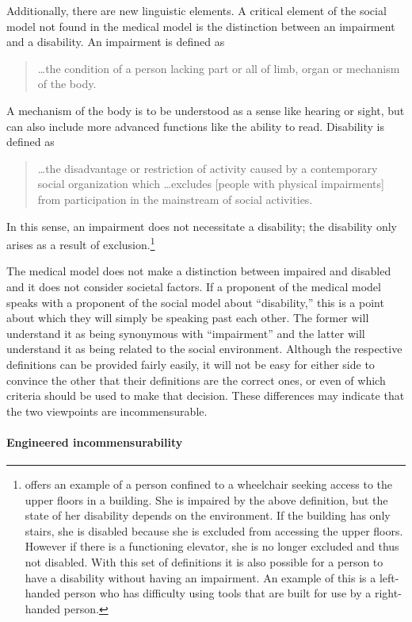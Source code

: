 \documentclass[a4paper]{article}
\begin{document}
Additionally, there are new linguistic elements. A critical element of the
social model not found in the medical model is the distinction between an
impairment and a disability. An impairment is defined as 
%
\begin{quote}
    \ldots the condition of a person lacking part or all of limb, organ or mechanism
    of the body.
\end{quote}
%
A mechanism of the body is to be understood as a sense like hearing or sight,
but can also include more advanced functions like the ability to read.
Disability is defined as 
%
\begin{quote}
    \ldots the disadvantage or restriction of activity caused by a contemporary
    social organization which \ldots excludes [people with physical
    impairments] from participation in the mainstream of social activities.
\end{quote}
%
In this sense, an impairment does not necessitate a disability; the disability
only arises as a result of exclusion.\footnote{\cite{winter2003development}
offers an example of a person confined to a wheelchair seeking access to the
upper floors in a building. She is impaired by the above definition, but the
state of her disability depends on the environment. If the building has only
stairs, she is disabled because she is excluded from accessing the upper
floors. However if there is a functioning elevator, she is no longer excluded
and thus not disabled. With this set of definitions it is also possible for a
person to have a disability without having an impairment. An example of this
is a left-handed person who has difficulty using tools that are built for use
by a right-handed person.}

The medical model does not make a distinction between impaired and disabled
and it does not consider societal factors. If a proponent of the medical model
speaks with a proponent of the social model about ``disability,'' this is a
point about which they will simply be speaking past each other. The former
will understand it as being synonymous with ``impairment'' and the latter will
understand it as being related to the social environment. Although the
respective definitions can be provided fairly easily, it will not be easy for
either side to convince the other that their definitions are the correct ones,
or even of which criteria should be used to make that decision. These
differences may indicate that the two viewpoints are incommensurable.

\paragraph{Engineered incommensurability}
\end{document}

